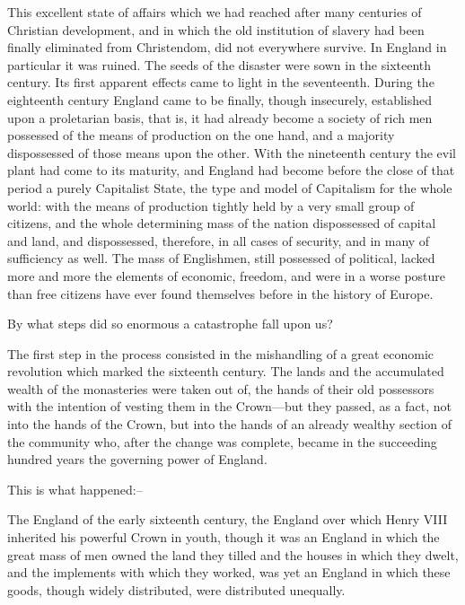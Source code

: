 \documentclass{book}
\begin{document}
This excellent state of affairs which we had reached after many centuries of Christian development, and in which the old institution of slavery had been finally eliminated from Christendom, did not everywhere survive. In England in particular it was ruined. The seeds of the disaster were sown in the sixteenth century. Its first apparent effects came to light in the seventeenth. During the eighteenth century England came to be finally, though insecurely, established upon a proletarian basis, that is, it had already become a society of rich men possessed of the means of production on the one hand, and a majority dispossessed of those means upon the other. With the nineteenth century the evil plant had come to its maturity, and England had become before the close of that period a purely Capitalist State, the type and model of Capitalism for the whole world: with the means of production tightly held by a very small group of citizens, and the whole determining mass of the nation dispossessed of capital and land, and dispossessed, therefore, in all cases of security, and in many of sufficiency as well. The mass of Englishmen, still possessed of political, lacked more and more the elements of economic, freedom, and were in a worse posture than free citizens have ever found themselves before in the history of Europe.

By what steps did so enormous a catastrophe fall upon us?

The first step in the process consisted in the mishandling of a great economic revolution which marked the sixteenth century. The lands and the accumulated wealth of the monasteries were taken out of, the hands of their old possessors with the intention of vesting them in the Crown—but they passed, as a fact, not into the hands of the Crown, but into the hands of an already wealthy section of the community who, after the change was complete, became in the succeeding hundred years the governing power of England.

This is what happened:–

The England of the early sixteenth century, the England over which Henry VIII inherited his powerful Crown in youth, though it was an England in which the great mass of men owned the land they tilled and the houses in which they dwelt, and the implements with which they worked, was yet an England in which these goods, though widely distributed, were distributed unequally.
\end{document}
